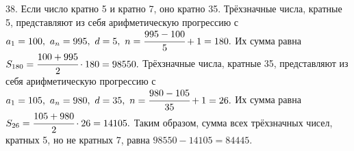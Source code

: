 38. Если число кратно 5 и кратно 7, оно кратно 35. Трёхзначные числа, кратные 5, представляют из себя арифметическую прогрессию с $a_1=100,\ a_n=995,\ d=5,\ n=\cfrac{995-100}{5}+1=180.$ Их сумма равна $S_{180}=\cfrac{100+995}{2}\cdot180=98550.$ Трёхзначные числа, кратные 35, представляют из себя арифметическую прогрессию с $a_1=105,\ a_n=980,\ d=35,\ n=\cfrac{980-105}{35}+1=26.$ Их сумма равна $S_{26}=\cfrac{105+980}{2}\cdot26=14105.$ Таким образом, сумма всех трёхзначных чисел, кратных 5, но не кратных 7, равна $98550-14105=84445.$\\
